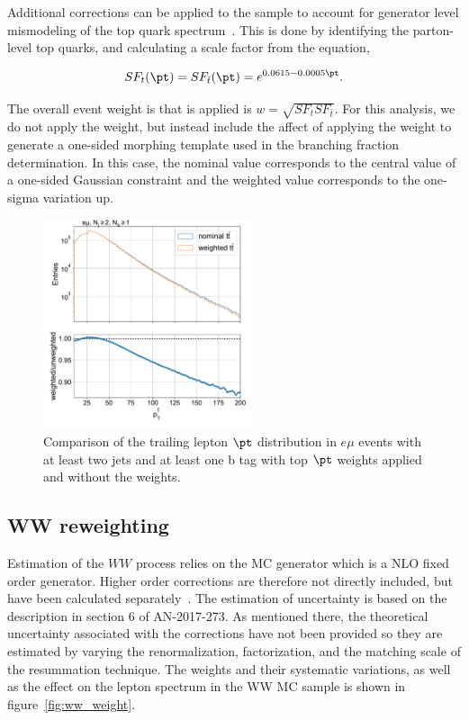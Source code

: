 Additional corrections can be applied to the \ttbar sample to account
for generator level mismodeling of the top quark \pt
spectrum~\cite{CMS-PAS-TOP-16-011, CMS-PAS-TOP-16-008}.  This is done by
identifying the parton-level top quarks, and calculating a scale factor
from the equation,

\begin{equation}
\nonumber
    SF_{t}(\pt) = SF_{\bar{t}}(\pt) = e^{0.0615-0.0005 \pt}.
\end{equation}

The overall event weight is that is applied is $w =
\sqrt{SF_{t}SF_{\bar{t}}}$.  For this analysis, we do not apply the
weight, but instead include the affect of applying the weight to
generate a one-sided morphing template used in the branching
fraction determination.  In this case, the nominal value corresponds to
the central value of a one-sided Gaussian constraint and the weighted
value corresponds to the one-sigma variation up.

\begin{figure}[h]
    \centering
    \includegraphics[width=0.55\textwidth]{figures/top_pt_weight}
    \caption{Comparison of the trailing lepton $\pt$ distribution in
        $e\mu$ events with at least two jets and at least one b tag with
        top $\pt$ weights applied and without the weights.
        \label{fig:top_pt_weight}
    } 
\end{figure}

\subsection{WW \pt reweighting}
\label{sec:ww_pt}

Estimation of the $WW$ process relies on the \POWHEG MC generator which is a
NLO fixed order generator.  Higher order corrections are therefore not directly
included, but have been calculated separately~\cite{Meade:2014fca,
Jaiswal:2014yba, Grazzini:2015wpa}.  The estimation of uncertainty is based on
the description in section 6 of AN-2017-273.  As mentioned there, the
theoretical uncertainty associated with the corrections have not been provided
so they are estimated by varying the renormalization, factorization, and the
matching scale of the \pt resummation technique.  The weights and their
systematic variations, as well as the effect on the lepton \pt spectrum in the
WW MC sample is shown in figure~\ref{fig:ww_weight}.

